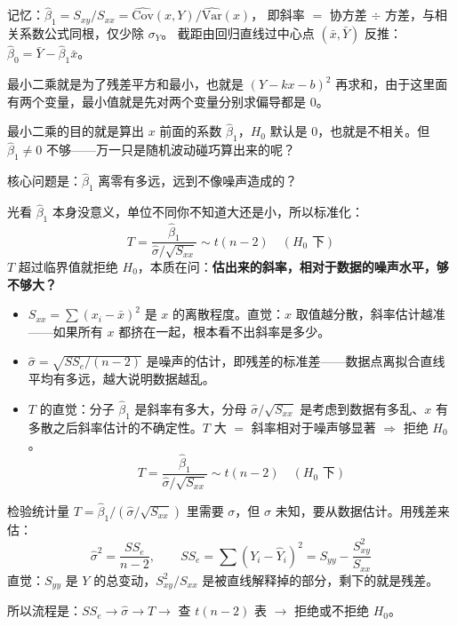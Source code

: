     \begin{note}
记忆：$\hat\beta_1=S_{xy}/S_{xx}=\widehat{\mathrm{Cov}}(x,Y)/\widehat{\mathrm{Var}}(x)$，
即斜率 $=$ 协方差 $\div$ 方差，与相关系数公式同根，仅少除 $\sigma_Y$。
截距由回归直线过中心点 $(\bar x,\bar Y)$ 反推：$\hat\beta_0=\bar Y-\hat\beta_1\bar x$。
\end{note}

\begin{dxtips}
   最小二乘就是为了残差平方和最小，也就是 $(Y - kx - b)^2$ 再求和，由于这里面有两个变量，最小值就是先对两个变量分别求偏导都是 $0$。
\end{dxtips}
\begin{note}
最小二乘的目的就是算出 $x$ 前面的系数 $\hat{\beta}_1$，$H_0$ 默认是 $0$，也就是不相关。但 $\hat{\beta}_1 \neq 0$ 不够——万一只是随机波动碰巧算出来的呢？

核心问题是：$\hat{\beta}_1$ 离零有多远，远到不像噪声造成的？

光看 $\hat{\beta}_1$ 本身没意义，单位不同你不知道大还是小，所以标准化：
\[
T = \frac{\hat{\beta}_1}{\hat{\sigma}/\sqrt{S_{xx}}} \sim t(n-2) \quad (H_0 \text{ 下})
\]
$T$ 超过临界值就拒绝 $H_0$，本质在问：\textbf{估出来的斜率，相对于数据的噪声水平，够不够大？}
\end{note}
\begin{itemize}
  \item $S_{xx} = \sum(x_i - \bar{x})^2$ 是 $x$ 的离散程度。直觉：$x$ 取值越分散，斜率估计越准——如果所有 $x$ 都挤在一起，根本看不出斜率是多少。
  \item $\hat{\sigma} = \sqrt{SS_e/(n-2)}$ 是噪声的估计，即残差的标准差——数据点离拟合直线平均有多远，越大说明数据越乱。
  \item $T$ 的直觉：分子 $\hat{\beta}_1$ 是斜率有多大，分母 $\hat{\sigma}/\sqrt{S_{xx}}$ 是考虑到数据有多乱、$x$ 有多散之后斜率估计的不确定性。$T$ 大 $=$ 斜率相对于噪声够显著 $\Rightarrow$ 拒绝 $H_0$。
\[
T = \frac{\hat{\beta}_1}{\hat{\sigma}/\sqrt{S_{xx}}} \sim t(n-2) \quad (H_0 \text{ 下})
\]
\end{itemize}
\begin{dxtips}
检验统计量 $T = \hat{\beta}_1 / (\hat{\sigma}/\sqrt{S_{xx}})$ 里需要 $\sigma$，但 $\sigma$ 未知，要从数据估计。用残差来估：
\[
\hat{\sigma}^2 = \frac{SS_e}{n-2}, \qquad SS_e = \sum(Y_i - \hat{Y}_i)^2 = S_{yy} - \frac{S_{xy}^2}{S_{xx}}
\]
直觉：$S_{yy}$ 是 $Y$ 的总变动，$S_{xy}^2/S_{xx}$ 是被直线解释掉的部分，剩下的就是残差。

所以流程是：$SS_e \to \hat{\sigma} \to T \to$ 查 $t(n-2)$ 表 $\to$ 拒绝或不拒绝 $H_0$。
\end{dxtips}

